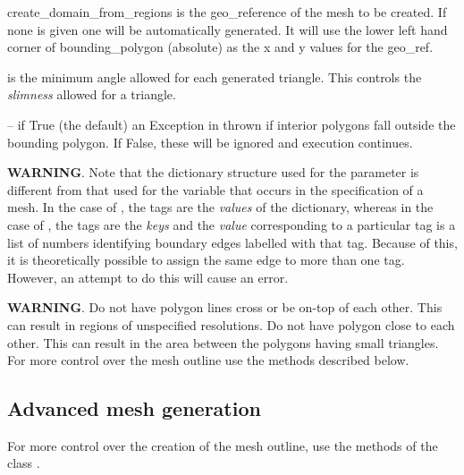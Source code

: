 \documentclass{manual}
\begin{document}
\begin{funcdesc}{create_domain_from_regions}
 is the geo_reference of the mesh to be created.
If none is given one will be automatically generated.  It will use
the lower left hand corner of  bounding_polygon (absolute)
as the x and y values for the geo_ref.

 is the minimum angle allowed for each generated triangle.
This controls the \emph{slimness} allowed for a triangle.

 -- if True (the default) an Exception in thrown
if interior polygons fall outside the bounding polygon. If False, these
will be ignored and execution continues.

\textbf{WARNING}. Note that the dictionary structure used for the
parameter  is different from that used for the
variable  that occurs in the specification of a mesh.
In the case of , the tags are the \emph{values} of
the dictionary, whereas in the case of , the
tags are the \emph{keys} and the \emph{value} corresponding to a
particular tag is a list of numbers identifying boundary edges
labelled with that tag. Because of this, it is theoretically
possible to assign the same edge to more than one tag. However, an
attempt to do this will cause an error.

\textbf{WARNING}. Do not have polygon lines cross or be on-top of each
    other. This can result in regions of unspecified resolutions. Do
    not have polygon close to each other. This can result in the area
    between the polygons having small triangles.  For more control
    over the mesh outline use the methods described below.

\end{funcdesc}

\subsection{Advanced mesh generation}

For more control over the creation of the mesh outline, use the
methods of the class .
\end{document}
